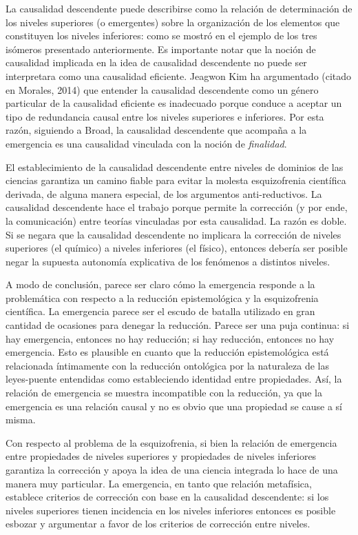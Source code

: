 \documentclass[]{book}
\begin{document}
\begin{refsection}
La causalidad descendente puede describirse como la relación de
determinación de los niveles superiores (o emergentes) sobre la
organización de los elementos que constituyen los niveles inferiores:
como se mostró en el ejemplo de los tres isómeros presentado
anteriormente. Es importante notar que la noción de causalidad implicada
en la idea de causalidad descendente no puede ser interpretara como una
causalidad eficiente. Jeagwon Kim ha argumentado (citado en Morales,
2014) que entender la causalidad descendente como un género particular
de la causalidad eficiente es inadecuado porque conduce a aceptar un
tipo de redundancia causal entre los niveles superiores e inferiores.
Por esta razón, siguiendo a Broad, la causalidad descendente que
acompaña a la emergencia es una causalidad vinculada con la noción de
\emph{finalidad}.

El establecimiento de la causalidad descendente entre niveles de
dominios de las ciencias garantiza un camino fiable para evitar la
molesta esquizofrenia científica derivada, de alguna manera especial, de
los argumentos anti-reductivos. La causalidad descendente hace el
trabajo porque permite la corrección (y por ende, la comunicación) entre
teorías vinculadas por esta causalidad. La razón es doble. Si se negara
que la causalidad descendente no implicara la corrección de niveles
superiores (el químico) a niveles inferiores (el físico), entonces
debería ser posible negar la supuesta autonomía explicativa de los
fenómenos a distintos niveles.

A modo de conclusión, parece ser claro cómo la emergencia responde a la
problemática con respecto a la reducción epistemológica y la
esquizofrenia científica. La emergencia parece ser el escudo de batalla
utilizado en gran cantidad de ocasiones para denegar la reducción.
Parece ser una puja continua: si hay emergencia, entonces no hay
reducción; si hay reducción, entonces no hay emergencia. Esto es
plausible en cuanto que la reducción epistemológica está relacionada
íntimamente con la reducción ontológica por la naturaleza de las
leyes-puente entendidas como estableciendo identidad entre propiedades.
Así, la relación de emergencia se muestra incompatible con la reducción,
ya que la emergencia es una relación causal y no es obvio que una
propiedad se cause a sí misma.

Con respecto al problema de la esquizofrenia, si bien la relación de
emergencia entre propiedades de niveles superiores y propiedades de
niveles inferiores garantiza la corrección y apoya la idea de una
ciencia integrada lo hace de una manera muy particular. La emergencia,
en tanto que relación metafísica, establece criterios de corrección con
base en la causalidad descendente: si los niveles superiores tienen
incidencia en los niveles inferiores entonces es posible esbozar y
argumentar a favor de los criterios de corrección entre niveles.


\end{refsection}
\end{document}
